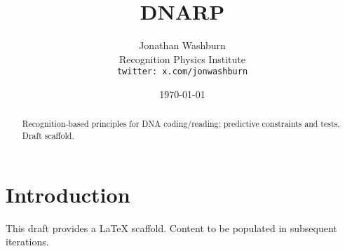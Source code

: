 \documentclass[11pt,letterpaper]{article}
\title{DNARP}
\author{Jonathan Washburn\\Recognition Physics Institute\\\texttt{twitter: x.com/jonwashburn}}
\date{\today}
\begin{document}
\maketitle
\begin{abstract}
Recognition-based principles for DNA coding/reading; predictive constraints and tests. Draft scaffold.
\end{abstract}
\section{Introduction}
This draft provides a LaTeX scaffold. Content to be populated in subsequent iterations.
\end{document}

